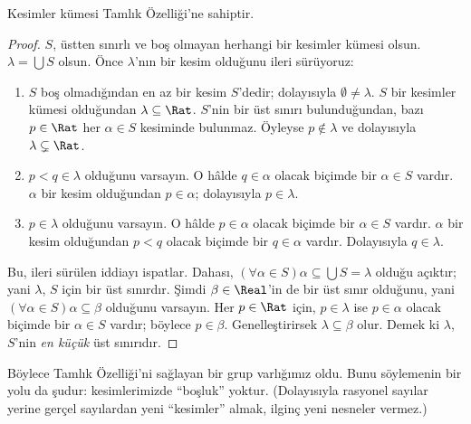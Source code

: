 \documentclass[../../../include/open-logic-section]{subfiles}
\begin{document}
\begin{thm}
Kesimler kümesi Tamlık Özelliği'ne sahiptir.
\end{thm}

\begin{proof}
$S$, üstten sınırlı ve boş olmayan herhangi bir kesimler kümesi olsun.
$\lambda = \bigcup S$ olsun.
Önce $\lambda$'nın bir kesim olduğunu ileri sürüyoruz:
\begin{enumerate}
\item $S$ boş olmadığından en az bir kesim $S$'dedir; dolayısıyla
$\emptyset \neq \lambda$. $S$ bir kesimler kümesi olduğundan
$\lambda \subseteq \Rat$. $S$'nin bir üst sınırı bulunduğundan, bazı
$p \in \Rat$ her $\alpha \in S$ kesiminde bulunmaz. Öyleyse
$p\notin \lambda$ ve dolayısıyla $\lambda \subsetneq \Rat$.
\item $p < q \in \lambda$ olduğunu varsayın. O hâlde $q \in \alpha$ olacak
biçimde bir $\alpha \in S$ vardır. $\alpha$ bir kesim olduğundan
$p \in \alpha$; dolayısıyla $p \in \lambda$.
\item $p \in \lambda$ olduğunu varsayın. O hâlde $p \in \alpha$ olacak
biçimde bir $\alpha \in S$ vardır. $\alpha$ bir kesim olduğundan
$p < q$ olacak biçimde bir $q \in \alpha$ vardır. Dolayısıyla
$q \in \lambda$.
\end{enumerate}
Bu, ileri sürülen iddiayı ispatlar. Dahası,
$(\forall \alpha \in S)\alpha \subseteq \bigcup S = \lambda$ olduğu açıktır;
yani $\lambda$, $S$ için bir üst sınırdır. Şimdi $\beta \in \Real$'in
de bir üst sınır olduğunu, yani
$(\forall \alpha \in S)\alpha \subseteq \beta$ olduğunu varsayın. Her
$p \in \Rat$ için, $p \in \lambda$ ise $p \in \alpha$ olacak biçimde bir
$\alpha \in S$ vardır; böylece $p \in \beta$. Genelleştirirsek
$\lambda \subseteq \beta$ olur. Demek ki $\lambda$, $S$'nin \emph{en küçük}
üst sınırıdır.
\end{proof}

Böylece Tamlık Özelliği'ni sağlayan bir grup varlığımız oldu. Bunu söylemenin
bir yolu da şudur: kesimlerimizde “boşluk” yoktur. (Dolayısıyla rasyonel
sayılar yerine gerçel sayılardan yeni “kesimler” almak, ilginç yeni nesneler
vermez.)
\end{document}
